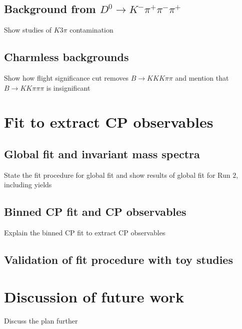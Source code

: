 \documentclass[12pt, a4paper, notitlepage, onecolumn]{article}
\numberwithin{equation}{section}
\begin{document}
\subsection{Background from $D^0\to K^-\pi^+\pi^-\pi^+$}
\noindent Show studies of $K3\pi$ contamination

\subsection{Charmless backgrounds}
\noindent Show how flight significance cut removes $B\to KKK\pi\pi$ and mention that $B\to KK\pi\pi\pi$ is insignificant

\section{Fit to extract CP observables}
\subsection{Global fit and invariant mass spectra}
\noindent State the fit procedure for global fit and show results of global fit for Run $2$, including yields

\subsection{Binned CP fit and CP observables}
\noindent Explain the binned CP fit to extract CP observables

\subsection{Validation of fit procedure with toy studies}

\section{Discussion of future work}
\noindent Discuss the plan further




\end{document}
